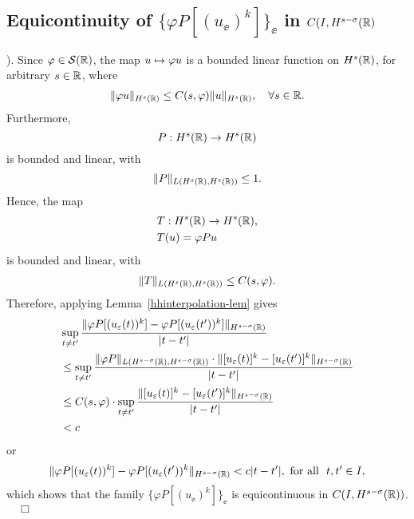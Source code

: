 \subsection{Equicontinuity of $\{ \varphi P [(u_\ee)^k]\}_\ee$  in $C(I,
H^{s-\sigma}(\mathbb{R})$}).
%
%
Since $\varphi \in \mathcal{S}(\mathbb{R})$, the map $u \mapsto \varphi u$
is a bounded linear function on $H^s(\mathbb{R})$, for arbitrary $s \in
\mathbb{R}$, where  
\begin{equation}
\begin{split}
\|\varphi u\|_{H^s(\mathbb{R})} \le C(s, \varphi)
\|u\|_{H^s(\mathbb{R})}, \quad \forall s\in \mathbb{R}.
\label{hhschwartz-estimate}
\end{split}
\end{equation}
Furthermore, $$P: H^s(\mathbb{R}) \to H^s(\mathbb{R})$$ is bounded and linear,
with 
\begin{equation}
\label{operator-normaa}
\|P\|_{L(H^s(\mathbb{R}), H^s(\mathbb{R}))} \le 1.
\end{equation}
Hence, the map 
\begin{equation}
\label{the-map}
\begin{split}
& T: H^s(\mathbb{R}) \to H^s(\mathbb{R}),
\\
& T(u) = \varphi P u 
\end{split}
\end{equation}
is bounded and linear, with 
\begin{equation}
\begin{split}
\|T\|_{L(H^s(\mathbb{R}), H^s(\mathbb{R}))} \le C(s, \varphi).
\label{op-norm-product}
\end{split}
\end{equation}
Therefore, applying Lemma~\ref{hhinterpolation-lem} gives 
%
\begin{equation*}
\begin{split}
\label{hhequic-1}
& \sup_{t \neq t'} \frac {\| \varphi P [(u_\varepsilon(t))^k] - \varphi
P [(u_\varepsilon(t'))^k] \|_{H^{s -
\sigma  }(\mathbb{R})}}{|t - t'|}
\\
& \le \sup_{t \neq t'}  \frac {\|\varphi P \|_{L(H^{s-\sigma}(\mathbb{R}),
H^{s-\sigma}(\mathbb{R}))} \cdot \|   [u_\varepsilon(t)]^k  - 
[u_\varepsilon(t')]^k \|_{H^{s -
\sigma }(\mathbb{R})}}{|t - t'|}
\\
& \le C(s, \varphi) \cdot \sup_{t \neq t'}  \frac {\|   [u_\varepsilon(t)]^k  - 
[u_\varepsilon(t')]^k \|_{H^{s -
\sigma }(\mathbb{R})}}{|t - t'|}
\\
&< c
\end{split}
\end{equation*}
%
or
%
\begin{equation*}
\label{hhequic-2}
\|\varphi P [(u_\varepsilon(t))^k] - \varphi
P [(u_\varepsilon(t'))^k \|_{H^{s - \sigma }(\mathbb{R})}< c|t -
t'|, 
\ \text{for all} \   \,\,  t, t'\in I,
\end{equation*}
%
which shows that  the family  $\{\varphi P [(u_\ee)^k]\}_\ee$ is
equicontinuous in $C(I, H^{s-\sigma }(\mathbb{R}))$.  $\quad \Box$
%
%
%
%
%
%
%
%
%
%
%		
